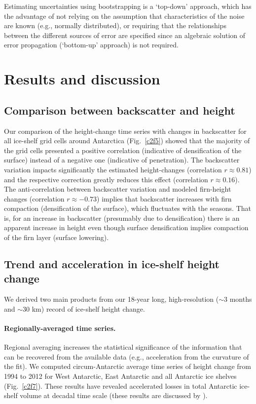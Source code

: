 Estimating uncertainties using bootstrapping is a `top-down' approach, which has the advantage of not relying on the assumption that characteristics of the noise are known (e.g., normally distributed), or requiring that the relationships between the different sources of error are specified since an algebraic solution of error propagation (`bottom-up' approach) is not required.

\section{Results and discussion}

\subsection{Comparison between backscatter and height}

Our comparison of the height-change time series with changes in backscatter for all ice-shelf grid cells around Antarctica (Fig.~\ref{c2f5}) showed that the majority of the grid cells presented a positive correlation (indicative of densification of the surface) instead of a negative one (indicative of penetration). The backscatter variation impacts significantly the estimated height-changes (correlation $r \approx 0.81$) and the respective correction greatly reduces this effect (correlation $r \approx 0.16$). The anti-correlation between backscatter variation and modeled firn-height changes (correlation $r \approx -0.73$) implies that backscatter increases with firn compaction (densification of the surface), which fluctuates with the seasons. That is, for an increase in backscatter (presumably due to densification) there is an apparent increase in height even though surface densification implies compaction of the firn layer (surface lowering).

\subsection{Trend and acceleration in ice-shelf height change}

We derived two main products from our 18-year long, high-resolution ($\sim$3 months and $\sim$30 km) record of ice-shelf height change.

\paragraph{Regionally-averaged time series.} Regional averaging increases the statistical significance of the information that can be recovered from the available data (e.g., acceleration from the curvature of the fit). We computed circum-Antarctic average time series of height change from 1994 to 2012 for West Antarctic, East Antarctic and all Antarctic ice shelves (Fig.~\ref{c2f7}). These results have revealed accelerated losses in total Antarctic ice-shelf volume at decadal time scale (these results are discussed by \textcite{Paolo2015}).


